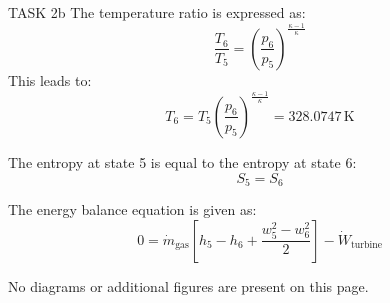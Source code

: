 TASK 2b  
The temperature ratio is expressed as:  
\[
\frac{T_6}{T_5} = \left( \frac{p_6}{p_5} \right)^{\frac{\kappa-1}{\kappa}}
\]  
This leads to:  
\[
T_6 = T_5 \left( \frac{p_6}{p_5} \right)^{\frac{\kappa-1}{\kappa}} = 328.0747 \, \text{K}
\]  

The entropy at state 5 is equal to the entropy at state 6:  
\[
S_5 = S_6
\]  

The energy balance equation is given as:  
\[
0 = \dot{m}_{\text{gas}} \left[ h_5 - h_6 + \frac{w_5^2 - w_6^2}{2} \right] - \dot{W}_{\text{turbine}}
\]  

No diagrams or additional figures are present on this page.